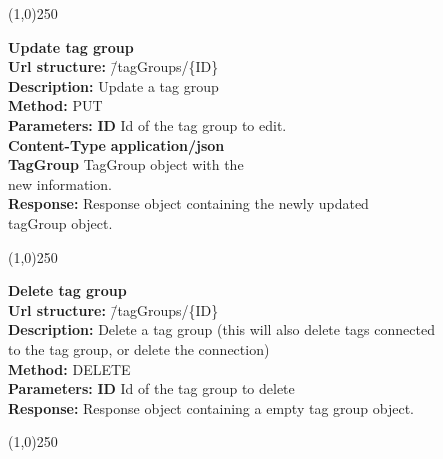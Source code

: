 \documentclass[11pt]{article}
\begin{document}
\begin{center}\line(1,0){250}\end{center}

\begin{tabbing}
\textbf{Update tag group} \\
\textcolor{black!60}{\textbf{Url structure:}} \hspace{0.2in} \= /tagGroups/\{ID\} \\
\textcolor{black!60}{\textbf{Description:}} \> Update a tag group \\
\textcolor{black!60}{\textbf{Method:}} \> PUT \\
\textcolor{black!60}{\textbf{Parameters:}} \> \textbf{ID} Id of the tag group to edit. \\
\textcolor{black!60}{\textbf{Content-Type}} \> \textbf{application/json} \\
\> \textbf{TagGroup} TagGroup object with the 
\\ \> new information. \\
\textcolor{black!60}{\textbf{Response:}} \> Response object containing the newly updated 
\\ \> tagGroup object.
\end{tabbing}

\begin{center}\line(1,0){250}\end{center}

\begin{tabbing}
\textbf{Delete tag group} \\
\textcolor{black!60}{\textbf{Url structure:}} \hspace{0.2in} \= /tagGroups/\{ID\} \\
\textcolor{black!60}{\textbf{Description:}}  \> Delete a tag group (this will also delete tags connected \\ \> to the tag group, or delete the connection) \\
\textcolor{black!60}{\textbf{Method:}} \> DELETE \\
\textcolor{black!60}{\textbf{Parameters:}} \> \textbf{ID} Id of the tag group to delete \\
\textcolor{black!60}{\textbf{Response:}} \> Response object containing a empty tag group object.
\end{tabbing}

\begin{center}\line(1,0){250}\end{center}
\end{document}
